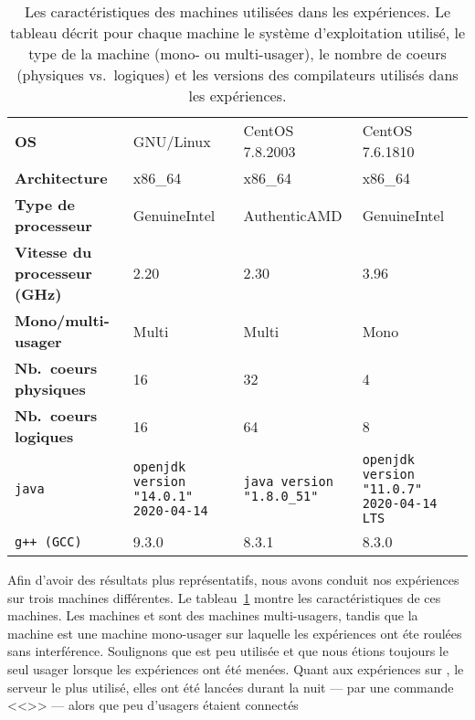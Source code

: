 


\newcommand{\LARGEUR}{3cm}

\begin{table}
\begin{tabular}{|p{3cm}|p{\LARGEUR}|p{\LARGEUR}|p{\LARGEUR}|}
\hline
  & \M1 & \M2 & \M3
\\\hline
\textbf{OS} & GNU/Linux & CentOS 7.8.2003 & CentOS 7.6.1810
\\\hline
\textbf{Architecture} &  x86\_64 & x86\_64 & x86\_64
\\\hline
\textbf{Type de processeur} & GenuineIntel  & AuthenticAMD & GenuineIntel
\\\hline
\textbf{Vitesse du processeur (GHz)} & 2.20 & 2.30 & 3.96
\\\hline
\textbf{Mono/multi-usager} & Multi & Multi & Mono
\\\hline
\textbf{Nb.~coeurs physiques} & 16 & 32 & 4
\\\hline
\textbf{Nb.~coeurs logiques} & 16 & 64 & 8
\\\hline
\texttt{java}
  & \texttt{openjdk version "14.0.1" 2020-04-14}
  & \texttt{java version "1.8.0\_51"}
  & \texttt{openjdk version "11.0.7" 2020-04-14 LTS}
\\\hline
\texttt{g++ (GCC)}
   & 9.3.0
   & 8.3.1 
   & 8.3.0
\\\hline
\end{tabular}
\caption[Les caract\'eristiques des machines utilis\'ees dans les exp\'eriences.]{Les caract\'eristiques des machines utilis\'ees dans les exp\'eriences. Le tableau d\'ecrit pour chaque machine le syst\`eme d'exploitation utilis\'e, le type de la machine (mono- ou multi-usager), le nombre de coeurs (physiques vs.\ logiques) et les versions des compilateurs utilis\'es dans les exp\'eriences.}
\label{machines.table}
\end{table}


Afin d'avoir des r\'esultats plus représentatifs, nous avons conduit nos exp\'eriences sur trois machines diff\'erentes. Le tableau~\ref{machines.table} montre les caract\'eristiques de ces machines. Les machines  et  sont des machines multi-usagers, tandis que la machine  est une machine mono-usager sur laquelle les exp\'eriences ont \'et\/e roul\'ees sans interf\'erence.
%
Soulignons que  est peu utilisée et que nous étions toujours
le seul usager lorsque les expériences ont été menées. Quant aux
expériences sur , le serveur  le plus utilisé, elles
ont été lancées durant la nuit --- par une commande <<>> --- alors que peu d'usagers étaient connectés

